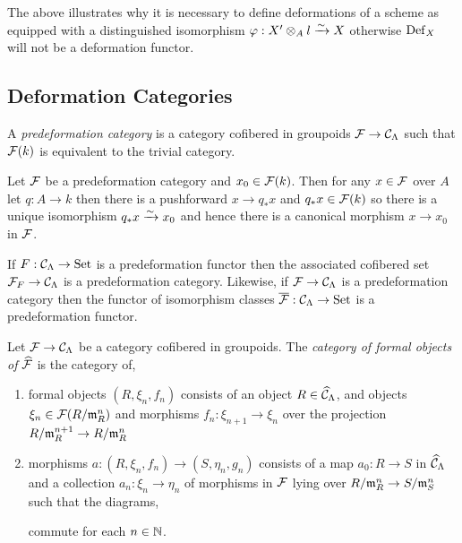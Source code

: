 \documentclass[12pt]{article}
\begin{document}
\begin{rmk}
The above illustrates why it is necessary to define deformations of a scheme as equipped with a distinguished isomorphism $\varphi : X' \otimes_A l \xrightarrow{\sim} X$ otherwise $\mathrm{Def}_X$ will not be a deformation functor.
\end{rmk}


\subsection{Deformation Categories}

\begin{defn}
A \textit{predeformation category} is a category cofibered in groupoids $\mathcal{F} \to \mathcal{C}_{\Lambda}$ such that $\mathcal{F}(k)$ is equivalent to the trivial category. 
\end{defn}

\begin{rmk}
Let $\mathcal{F}$ be a predeformation category and $x_0 \in \mathcal{F}(k)$. Then for any $x \in \mathcal{F}$ over $A$ let $q : A \to k$ then there is a pushforward $x \to q_* x$ and $q_* x \in \mathcal{F}(k)$ so there is a unique isomorphism $q_* x \xrightarrow{\sim} x_0$ and hence there is a canonical morphism $x \to x_0$ in $\mathcal{F}$. 
\end{rmk}

\begin{rmk}
If $F : \mathcal{C}_\Lambda \to \mathrm{Set}$ is a predeformation functor then the associated cofibered set $\mathcal{F}_F \to \mathcal{C}_{\Lambda}$ is a predeformation category. Likewise, if $\mathcal{F} \to \mathcal{C}_\Lambda$ is a predeformation category then the functor of isomorphism classes $\overline{\mathcal{F}} : \mathcal{C}_{\Lambda} \to \mathrm{Set}$ is a predeformation functor. 
\end{rmk}

\begin{defn}
Let $\mathcal{F} \to \mathcal{C}_\Lambda$ be a category cofibered in groupoids. The \textit{category of formal objects of} $\widehat{\mathcal{F}}$ is the category of,
\begin{enumerate}
\item formal objects $(R, \xi_n, f_n)$ consists of an object $R \in \widehat{\mathcal{C}}_\Lambda$, and objects $\xi_n \in \mathcal{F}(R/\mathfrak{m}_R^n)$ and morphisms $f_n : \xi_{n+1} \to \xi_n$ over the projection $R / \mathfrak{m}_R^{n+1} \to R / \mathfrak{m}_R^n$

\item morphisms $a : (R, \xi_n, f_n) \to (S, \eta_n, g_n)$ consists of a map $a_0 : R \to S$ in $\widehat{\mathcal{C}}_\Lambda$ and a collection $a_n : \xi_n \to \eta_n$ of morphisms in $\mathcal{F}$ lying over $R / \mathfrak{m}_R^n \to S / \mathfrak{m}_S^n$ such that the diagrams,
\begin{center}
\end{center} 
commute for each $n \in \mathbb{N}$.
\end{enumerate}
\end{defn}
\end{document}
